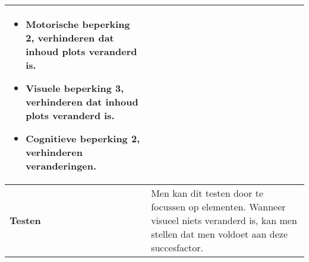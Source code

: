 \begin{table}[H]
\begin{tabular}{|l|p{12cm}|}
\begin{itemize}
            \item Motorische beperking 2, verhinderen dat inhoud plots veranderd is.
             \item Visuele beperking 3, verhinderen dat inhoud plots veranderd is.
            \item Cognitieve beperking 2, verhinderen veranderingen.
        \end{itemize}                                                                                                                                                                                                                                                                                                     \\ 
        
        \hline
        \textbf{Testen}                       & Men kan dit testen door te focussen op elementen. Wanneer visueel niets veranderd is, kan men stellen dat men voldoet aan deze succesfactor.                         \\
        \hline
    \end{tabular}
    
\end{table}

